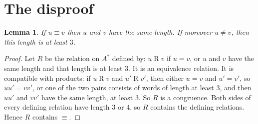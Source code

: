 \documentclass[11pt]{article}
\newtheorem{lemma}[theorem]{Lemma}
\theoremstyle{remark}
\newcommand{\hypo}{\equiv}
\begin{document}
\section*{The disproof}
\begin{lemma}\label{lem:short}
If $u\hypo v$ then $u$ and $v$ have the same length. If moreover
$u\ne v$, then this length is at least $3$.
\end{lemma}
\begin{proof}
Let $R$ be the relation on $A^*$ defined by: $u\mathrel{R}v$ if $u=v$,
or $u$ and $v$ have the same length and that length is at least $3$.
It is an equivalence relation. It is compatible with products: if
$u\mathrel{R}v$ and $u'\mathrel{R}v'$, then either $u=v$ and $u'=v'$,
so $uu'=vv'$, or one of the two pairs consists of words of length at
least $3$, and then $uu'$ and $vv'$ have the same length, at least $3$.
So $R$ is a congruence. Both sides of every defining relation have
length $3$ or $4$, so $R$ contains the defining relations. Hence $R$
contains $\hypo$.
\end{proof}
\end{document}
